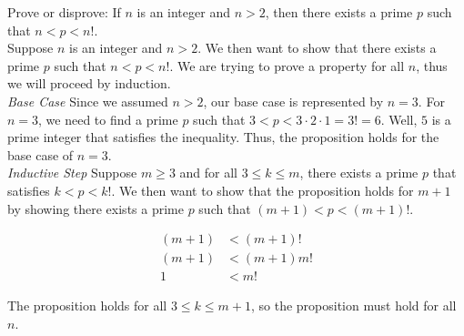 \documentclass[12pt]{article}
\newenvironment{problem}[2][Problem]{\begin{trivlist}
\item[\hskip \labelsep {\bfseries #1}\hskip \labelsep {\bfseries #2.}]}{\end{trivlist}}
\begin{document}


\begin{problem}{7}
Prove or disprove: If $n$ is an integer and $n>2$, then there exists a prime $p$ such that $n<p<n!$. \\

\noindent
Suppose $n$ is an integer and $n>2$. We then want to show that there exists a prime $p$ such that $n<p<n!$. We are trying to prove a property for all $n$, thus we will proceed by induction. \\

\noindent
\textit{Base Case} Since we assumed $n>2$, our base case is represented by $n=3$. For $n=3$, we need to find a prime $p$ such that $3<p<3 \cdot 2 \cdot 1=3!=6$. Well, $5$ is a prime integer that satisfies the inequality. Thus, the proposition holds for the base case of $n=3$. \\

\noindent
\textit{Inductive Step} Suppose $m \geq 3$ and for all $3 \leq k \leq m$, there exists a prime $p$ that satisfies $k<p<k!$. We then want to show that the proposition holds for $m+1$ by showing there exists a prime $p$ such that $(m+1)<p<(m+1)!$.

\begin{align*}
(m+1) & < (m+1)! \\
(m+1) & < (m+1)m! \\
1 & < m!
\end{align*}

\noindent
The proposition holds for all $3 \leq k \leq m+1$, so the proposition must hold for all $n$. \qedsymbol
 \end{problem}

\end{document}
